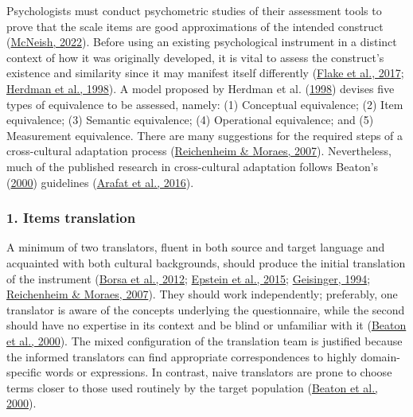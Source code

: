 \documentclass[
  ,doc,11pt, twoside,floatsintext]{apa6}
\begin{document}
Psychologists must conduct psychometric studies of their assessment tools to prove that the scale items are good approximations of the intended construct (\protect\hyperlink{ref-mcneish2022a}{McNeish, 2022}). Before using an existing psychological instrument in a distinct context of how it was originally developed, it is vital to assess the construct's existence and similarity since it may manifest itself differently (\protect\hyperlink{ref-flakeConstructValidationSocial2017}{Flake et al., 2017}; \protect\hyperlink{ref-herdmanModelEquivalenceCultural1998}{Herdman et al., 1998}). A model proposed by Herdman et al. (\protect\hyperlink{ref-herdmanModelEquivalenceCultural1998}{1998}) devises five types of equivalence to be assessed, namely: (1) Conceptual equivalence; (2) Item equivalence; (3) Semantic equivalence; (4) Operational equivalence; and (5) Measurement equivalence. There are many suggestions for the required steps of a cross-cultural adaptation process (\protect\hyperlink{ref-reichenheim2007}{Reichenheim \& Moraes, 2007}). Nevertheless, much of the published research in cross-cultural adaptation follows Beaton's (\protect\hyperlink{ref-beaton2000}{2000}) guidelines (\protect\hyperlink{ref-arafat2016}{Arafat et al., 2016}).

\hypertarget{items-translation}{%
\subsubsection{1. Items translation}\label{items-translation}}

A minimum of two translators, fluent in both source and target language and acquainted with both cultural backgrounds, should produce the initial translation of the instrument (\protect\hyperlink{ref-borsaAdaptacaoValidacaoInstrumentos2012}{Borsa et al., 2012}; \protect\hyperlink{ref-epstein2015}{Epstein et al., 2015}; \protect\hyperlink{ref-geisinger1994}{Geisinger, 1994}; \protect\hyperlink{ref-reichenheim2007}{Reichenheim \& Moraes, 2007}). They should work independently; preferably, one translator is aware of the concepts underlying the questionnaire, while the second should have no expertise in its context and be blind or unfamiliar with it (\protect\hyperlink{ref-beaton2000}{Beaton et al., 2000}). The mixed configuration of the translation team is justified because the informed translators can find appropriate correspondences to highly domain-specific words or expressions. In contrast, naive translators are prone to choose terms closer to those used routinely by the target population (\protect\hyperlink{ref-beaton2000}{Beaton et al., 2000}).
\end{document}
